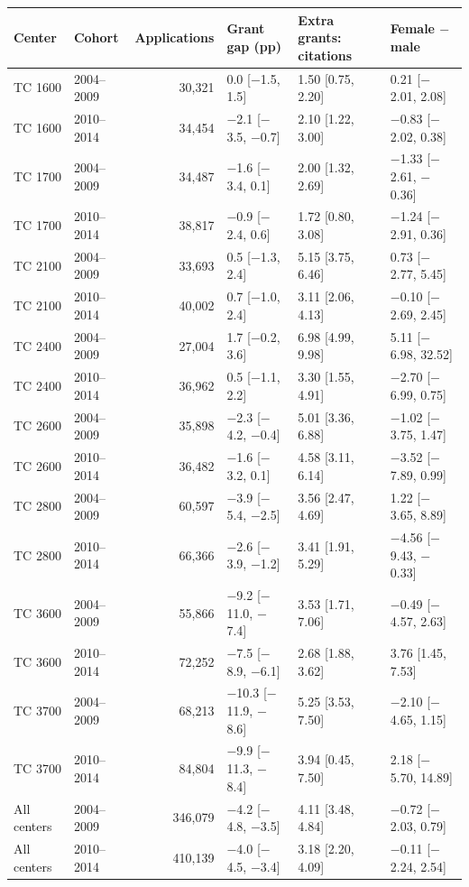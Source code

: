 \begin{tabular}{llrlll}
\toprule
Center & Cohort & Applications & Grant gap (pp) & Extra grants: citations & Female $-$ male \\
\midrule
TC 1600 & 2004–2009 & 30,321 & 0.0 [$-$1.5, 1.5] & 1.50 [0.75, 2.20] & 0.21 [$-$2.01, 2.08] \\
TC 1600 & 2010–2014 & 34,454 & $-$2.1 [$-$3.5, $-$0.7] & 2.10 [1.22, 3.00] & $-$0.83 [$-$2.02, 0.38] \\
TC 1700 & 2004–2009 & 34,487 & $-$1.6 [$-$3.4, 0.1] & 2.00 [1.32, 2.69] & $-$1.33 [$-$2.61, $-$0.36] \\
TC 1700 & 2010–2014 & 38,817 & $-$0.9 [$-$2.4, 0.6] & 1.72 [0.80, 3.08] & $-$1.24 [$-$2.91, 0.36] \\
TC 2100 & 2004–2009 & 33,693 & 0.5 [$-$1.3, 2.4] & 5.15 [3.75, 6.46] & 0.73 [$-$2.77, 5.45] \\
TC 2100 & 2010–2014 & 40,002 & 0.7 [$-$1.0, 2.4] & 3.11 [2.06, 4.13] & $-$0.10 [$-$2.69, 2.45] \\
TC 2400 & 2004–2009 & 27,004 & 1.7 [$-$0.2, 3.6] & 6.98 [4.99, 9.98] & 5.11 [$-$6.98, 32.52] \\
TC 2400 & 2010–2014 & 36,962 & 0.5 [$-$1.1, 2.2] & 3.30 [1.55, 4.91] & $-$2.70 [$-$6.99, 0.75] \\
TC 2600 & 2004–2009 & 35,898 & $-$2.3 [$-$4.2, $-$0.4] & 5.01 [3.36, 6.88] & $-$1.02 [$-$3.75, 1.47] \\
TC 2600 & 2010–2014 & 36,482 & $-$1.6 [$-$3.2, 0.1] & 4.58 [3.11, 6.14] & $-$3.52 [$-$7.89, 0.99] \\
TC 2800 & 2004–2009 & 60,597 & $-$3.9 [$-$5.4, $-$2.5] & 3.56 [2.47, 4.69] & 1.22 [$-$3.65, 8.89] \\
TC 2800 & 2010–2014 & 66,366 & $-$2.6 [$-$3.9, $-$1.2] & 3.41 [1.91, 5.29] & $-$4.56 [$-$9.43, $-$0.33] \\
TC 3600 & 2004–2009 & 55,866 & $-$9.2 [$-$11.0, $-$7.4] & 3.53 [1.71, 7.06] & $-$0.49 [$-$4.57, 2.63] \\
TC 3600 & 2010–2014 & 72,252 & $-$7.5 [$-$8.9, $-$6.1] & 2.68 [1.88, 3.62] & 3.76 [1.45, 7.53] \\
TC 3700 & 2004–2009 & 68,213 & $-$10.3 [$-$11.9, $-$8.6] & 5.25 [3.53, 7.50] & $-$2.10 [$-$4.65, 1.15] \\
TC 3700 & 2010–2014 & 84,804 & $-$9.9 [$-$11.3, $-$8.4] & 3.94 [0.45, 7.50] & 2.18 [$-$5.70, 14.89] \\
All centers & 2004–2009 & 346,079 & $-$4.2 [$-$4.8, $-$3.5] & 4.11 [3.48, 4.84] & $-$0.72 [$-$2.03, 0.79] \\
All centers & 2010–2014 & 410,139 & $-$4.0 [$-$4.5, $-$3.4] & 3.18 [2.20, 4.09] & $-$0.11 [$-$2.24, 2.54] \\
\bottomrule
\end{tabular}
